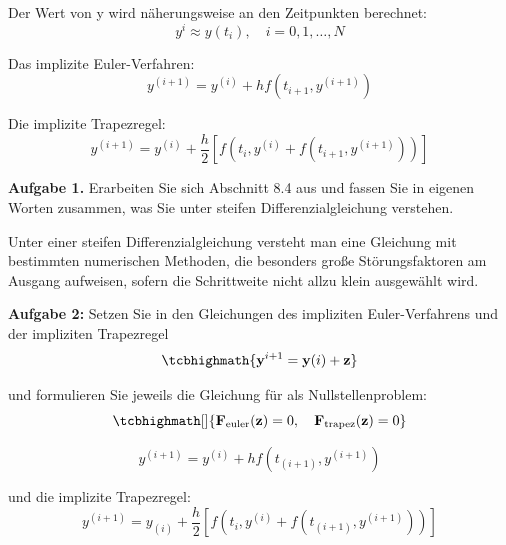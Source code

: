 Der Wert von y wird näherungsweise an den Zeitpunkten berechnet:
\begin{equation}
	 y^i \approx y(t_i),\quad i = 0,1,\dots,N 
\end{equation}


Das implizite Euler-Verfahren:
\begin{equation}
	 y^{(i+1)} = y^{(i)} + hf\left(t_{i+1},y^{(i+1)}\right) 
\end{equation}


Die implizite Trapezregel:
\begin{equation}
	y^{(i+1)} = y^{(i)} + \frac{h}{2}\left[f\left(t_i, y^{(i)} + f(t_{i+1},y^{(i+1)})\right)\right] 
\end{equation}

\begin{mybox}
\textbf{Aufgabe 1.}	
	Erarbeiten Sie sich Abschnitt 8.4 aus \cite{Atkinson.2004} und fassen Sie in eigenen Worten zusammen, was Sie unter steifen Differenzialgleichung verstehen.
\end{mybox}

	Unter einer steifen Differenzialgleichung versteht man eine Gleichung mit bestimmten numerischen Methoden, die besonders große Störungsfaktoren am Ausgang aufweisen, sofern die Schrittweite nicht allzu klein ausgewählt wird.




\begin{mybox}
	\textbf{Aufgabe 2:}
	Setzen Sie in den Gleichungen des impliziten Euler-Verfahrens und der impliziten Trapezregel
	\begin{equation*}
	\tcbhighmath{\mathbf{y}^{i+1} = \mathbf{y}(i) + \mathbf{z}}  
	\end{equation*}
	
	und formulieren Sie jeweils die Gleichung für  als Nullstellenproblem:
	\begin{equation*}
		\tcbhighmath[]{\mathbf{F}_{\mathrm{euler}}(\mathbf{z}) = 0,\quad \mathbf{F}_{\mathrm{trapez}}(\mathbf{z}) = 0}   
	\end{equation*}
	
\end{mybox}


\begin{equation}
 	y^{(i+1)} = y^{(i)} + hf\left(t_{(i+1)},y^{(i+1)}\right) 
\end{equation}


und die implizite Trapezregel:
\begin{equation}
	 y^{(i+1)} = y_{(i)} + \dfrac{h}{2}\left[f\left(t_i, y^{(i)} + f\left(t_{(i+1)},y^{(i+1)}\right)\right)\right] 
\end{equation}

